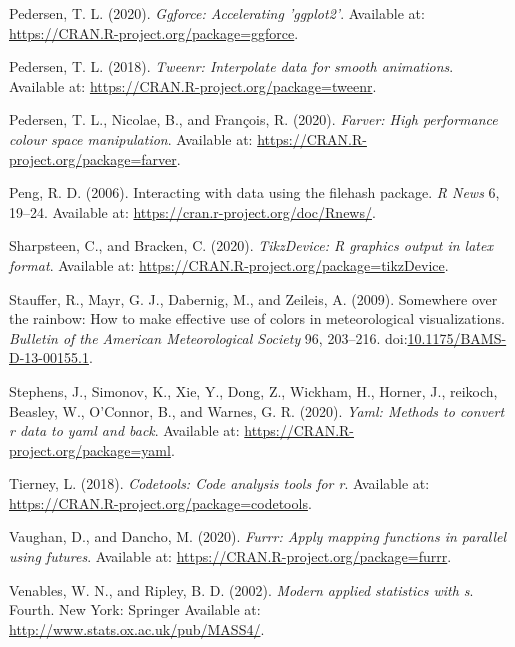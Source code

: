 \documentclass[utf8]{frontiersSCNS}
\newlength{\cslhangindent}
\newenvironment{cslreferences}%
  {\setlength{\parindent}{0pt}%
  \everypar{\setlength{\hangindent}{\cslhangindent}}\ignorespaces}%
  {\par}
\begin{document}
\begin{cslreferences}
\leavevmode\hypertarget{ref-pedersen2020ggforce}{}%
Pedersen, T. L. (2020). \emph{Ggforce: Accelerating 'ggplot2'}.
Available at: \url{https://CRAN.R-project.org/package=ggforce}.

\leavevmode\hypertarget{ref-pedersen2018tweenr}{}%
Pedersen, T. L. (2018). \emph{Tweenr: Interpolate data for smooth
animations}. Available at:
\url{https://CRAN.R-project.org/package=tweenr}.

\leavevmode\hypertarget{ref-pedersen2020farver}{}%
Pedersen, T. L., Nicolae, B., and François, R. (2020). \emph{Farver:
High performance colour space manipulation}. Available at:
\url{https://CRAN.R-project.org/package=farver}.

\leavevmode\hypertarget{ref-peng2006interacting}{}%
Peng, R. D. (2006). Interacting with data using the filehash package.
\emph{R News} 6, 19--24. Available at:
\url{https://cran.r-project.org/doc/Rnews/}.

\leavevmode\hypertarget{ref-sharpsteen2020tikzdevice}{}%
Sharpsteen, C., and Bracken, C. (2020). \emph{TikzDevice: R graphics
output in latex format}. Available at:
\url{https://CRAN.R-project.org/package=tikzDevice}.

\leavevmode\hypertarget{ref-stauffer2009somewhere}{}%
Stauffer, R., Mayr, G. J., Dabernig, M., and Zeileis, A. (2009).
Somewhere over the rainbow: How to make effective use of colors in
meteorological visualizations. \emph{Bulletin of the American
Meteorological Society} 96, 203--216.
doi:\href{https://doi.org/10.1175/BAMS-D-13-00155.1}{10.1175/BAMS-D-13-00155.1}.

\leavevmode\hypertarget{ref-stephens2020yaml}{}%
Stephens, J., Simonov, K., Xie, Y., Dong, Z., Wickham, H., Horner, J.,
reikoch, Beasley, W., O'Connor, B., and Warnes, G. R. (2020).
\emph{Yaml: Methods to convert r data to yaml and back}. Available at:
\url{https://CRAN.R-project.org/package=yaml}.

\leavevmode\hypertarget{ref-tierney2018codetools}{}%
Tierney, L. (2018). \emph{Codetools: Code analysis tools for r}.
Available at: \url{https://CRAN.R-project.org/package=codetools}.

\leavevmode\hypertarget{ref-vaughan2020furrr}{}%
Vaughan, D., and Dancho, M. (2020). \emph{Furrr: Apply mapping functions
in parallel using futures}. Available at:
\url{https://CRAN.R-project.org/package=furrr}.

\leavevmode\hypertarget{ref-venables2002modern}{}%
Venables, W. N., and Ripley, B. D. (2002). \emph{Modern applied
statistics with s}. Fourth. New York: Springer Available at:
\url{http://www.stats.ox.ac.uk/pub/MASS4/}.


\end{cslreferences}
\end{document}
